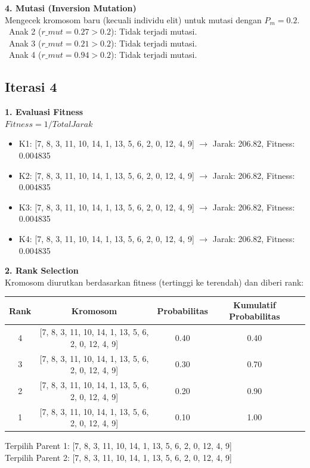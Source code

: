 \documentclass[12pt]{article}
\begin{document}
\vspace{0.5cm}
\noindent\textbf{4. Mutasi (Inversion Mutation)}\\Mengecek kromosom baru (kecuali individu elit) untuk mutasi dengan $P_m = 0.2$.\\
\textbullet\ Anak 2 ($r\_mut = 0.27 > 0.2$): Tidak terjadi mutasi.\\
\textbullet\ Anak 3 ($r\_mut = 0.21 > 0.2$): Tidak terjadi mutasi.\\
\textbullet\ Anak 4 ($r\_mut = 0.94 > 0.2$): Tidak terjadi mutasi.\\
\vspace{1cm}
\subsection*{Iterasi 4}
\textbf{1. Evaluasi Fitness}\\$Fitness = 1 / Total Jarak$
\begin{itemize}
\item K1: [7, 8, 3, 11, 10, 14, 1, 13, 5, 6, 2, 0, 12, 4, 9] $\rightarrow$ Jarak: 206.82, Fitness: 0.004835
\item K2: [7, 8, 3, 11, 10, 14, 1, 13, 5, 6, 2, 0, 12, 4, 9] $\rightarrow$ Jarak: 206.82, Fitness: 0.004835
\item K3: [7, 8, 3, 11, 10, 14, 1, 13, 5, 6, 2, 0, 12, 4, 9] $\rightarrow$ Jarak: 206.82, Fitness: 0.004835
\item K4: [7, 8, 3, 11, 10, 14, 1, 13, 5, 6, 2, 0, 12, 4, 9] $\rightarrow$ Jarak: 206.82, Fitness: 0.004835
\end{itemize}
\vspace{0.5cm}\textbf{2. Rank Selection}\\Kromosom diurutkan berdasarkan fitness (tertinggi ke terendah) dan diberi rank:
\begin{table}[h!]\centering\begin{tabular}{ccccc}\toprule Rank & Kromosom & Probabilitas & Kumulatif Probabilitas \\ \midrule
4 & [7, 8, 3, 11, 10, 14, 1, 13, 5, 6, 2, 0, 12, 4, 9] & 0.40 & 0.40 \\
3 & [7, 8, 3, 11, 10, 14, 1, 13, 5, 6, 2, 0, 12, 4, 9] & 0.30 & 0.70 \\
2 & [7, 8, 3, 11, 10, 14, 1, 13, 5, 6, 2, 0, 12, 4, 9] & 0.20 & 0.90 \\
1 & [7, 8, 3, 11, 10, 14, 1, 13, 5, 6, 2, 0, 12, 4, 9] & 0.10 & 1.00 \\
\bottomrule\end{tabular}\end{table}
Terpilih Parent 1: [7, 8, 3, 11, 10, 14, 1, 13, 5, 6, 2, 0, 12, 4, 9]\\
Terpilih Parent 2: [7, 8, 3, 11, 10, 14, 1, 13, 5, 6, 2, 0, 12, 4, 9]
\vspace{0.5cm}
\end{document}
